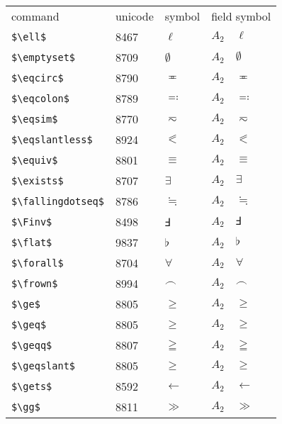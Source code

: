 \documentclass{article}
\begin{document}
\begin{table}
\begin{center}
\begin{tabular}{llll}
 command                    &unicode & symbol                & field symbol\\
 \verb#$\ell$#                & 8467 & $\ell$                & $A_2\quad \ell$\\
 \verb#$\emptyset$#           & 8709 & $\emptyset$           & $A_2\quad \emptyset$\\
 \verb#$\eqcirc$#             & 8790 & $\eqcirc$             & $A_2\quad \eqcirc$\\
 \verb#$\eqcolon$#            & 8789 & $\eqcolon$            & $A_2\quad \eqcolon$\\
 \verb#$\eqsim$#              & 8770 & $\eqsim$              & $A_2\quad \eqsim$\\
 \verb#$\eqslantless$#        & 8924 & $\eqslantless$        & $A_2\quad \eqslantless$\\
 \verb#$\equiv$#              & 8801 & $\equiv$              & $A_2\quad \equiv$\\
 \verb#$\exists$#             & 8707 & $\exists$             & $A_2\quad \exists$\\
 \verb#$\fallingdotseq$#      & 8786 & $\fallingdotseq$      & $A_2\quad \fallingdotseq$\\
 \verb#$\Finv$#               & 8498 & $\Finv$               & $A_2\quad \Finv$\\
 \verb#$\flat$#               & 9837 & $\flat$               & $A_2\quad \flat$\\
 \verb#$\forall$#             & 8704 & $\forall$             & $A_2\quad \forall$\\
 \verb#$\frown$#              & 8994 & $\frown$              & $A_2\quad \frown$\\
 \verb#$\ge$#                 & 8805 & $\ge$                 & $A_2\quad \ge$\\
 \verb#$\geq$#                & 8805 & $\geq$                & $A_2\quad \geq$\\
 \verb#$\geqq$#               & 8807 & $\geqq$               & $A_2\quad \geqq$\\
 \verb#$\geqslant$#           & 8805 & $\geqslant$           & $A_2\quad \geqslant$\\
 \verb#$\gets$#               & 8592 & $\gets$               & $A_2\quad \gets$\\
 \verb#$\gg$#                 & 8811 & $\gg$                 & $A_2\quad \gg$\\

\end{tabular}
\end{center}
\end{table}
\end{document}
